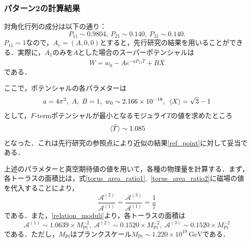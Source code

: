 \documentclass[a4paper,uplatex,dvipdfmx,10pt]{jsarticle}
\theoremstyle{definition}
\begin{document}
\subsubsection*{パターン2の計算結果}

対角化行列の成分は以下の通り：
\begin{equation}
   P_{11}\sim 0.9804
   ,\ 
   P_{21}\sim 0.140
   ,\ 
   P_{31}\sim 0.140
   .
   \nonumber
\end{equation}
$P_{11}\sim 1$なので，$A_{r}=(A,0,0)$とすると，先行研究の結果を用いることができる．実際に，$A_{1}$のみを$A$とした場合のスーパーポテンシャルは
\begin{equation}
   W
   =
   w_{0}
   -
   Ae^{- aP_{11}\tilde{T}}
   +
   BX
   \nonumber
\end{equation}
である．

ここで，ポテンシャルの各パラメターは
\begin{equation}
   a
   =
   4 \pi^2
   ,\ 
   A,\ B
   =
   1
   ,\ 
   w_{0}
   \sim
   2.166
   \times
   10^{-18}
   ,\ 
   \ev*{X}
   =
   \sqrt{3}-1
   \nonumber
\end{equation}
として，$F$-termポテンシャルが最小となるモジュライ$T$の値を求めたところ
\begin{equation}
   \ev*{\tilde{T}}
   \sim
   1.085
   \label{moduli_parameter}
\end{equation}
となった．これは先行研究の参照点により近似の結果\eqref{ref_point}に対して妥当である．

上述のパラメターと真空期待値の値を用いて，各種の物理量を計算する．まず，各トーラスの面積比は，式\eqref{torus_area_ratio1},\ \eqref{torus_area_ratio2}に磁場の値を代入することにより，
\begin{equation}
   \frac{\mathcal{A}^{(2)}}{\mathcal{A}^{(1)}}
   =
   \frac{\mathcal{A}^{(3)}}{\mathcal{A}^{(1)}}
   =
   \frac{1}{7}
   \nonumber
\end{equation}
である．また，\eqref{relation_moduli}より，各トーラスの面積は
\begin{equation}
   \mathcal{A}^{(1)}
   \sim
   1.0639
   \times
   M_{\text{Pl}}^{-2}
   ,\ 
   \mathcal{A}^{(2)}
   \sim
   0.1520
   \times
   M_{\text{Pl}}^{-2}
   ,\ 
   \mathcal{A}^{(3)}
   \sim   
   0.1520
   \times
   M_{\text{Pl}}^{-2}
   \nonumber
\end{equation}
である．ただし，$M_{\text{Pl}}$はプランクスケール$M_{\text{Pl}}\sim 1.220\times 10^{19}\ \text{GeV}$である．
\end{document}
